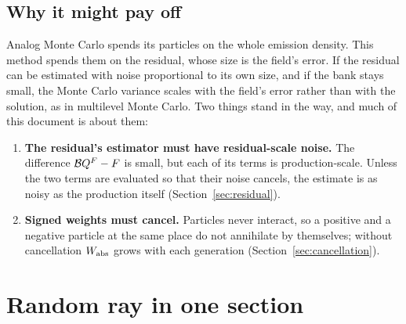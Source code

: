 \subsection{Why it might pay off}

Analog Monte Carlo spends its particles on the whole emission density. This method spends them on
the residual, whose size is the field's error. If the residual can be estimated with noise
proportional to its own size, and if the bank stays small, the Monte Carlo variance scales with the
field's error rather than with the solution, as in multilevel Monte Carlo. Two things stand in the way,
and much of this document is about them:
\begin{enumerate}
\item \textbf{The residual's estimator must have residual-scale noise.} The difference
  $\mathcal B Q^F-F$ is small, but each of its terms is production-scale. Unless the two terms are evaluated
  so that their noise cancels, the estimate is as noisy as the production itself
  (Section~\ref{sec:residual}).
\item \textbf{Signed weights must cancel.} Particles never interact, so a positive and a negative
  particle at the same place do not annihilate by themselves; without cancellation $W_{\mathrm{abs}}$ grows
  with each generation (Section~\ref{sec:cancellation}).
\end{enumerate}

\section{Random ray in one section}\label{sec:randomray}

